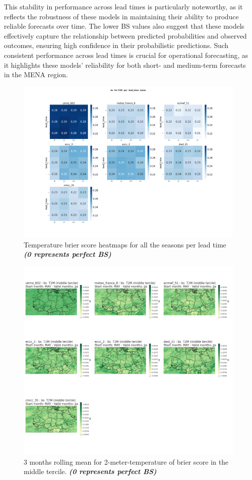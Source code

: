 This stability in performance across lead times is particularly noteworthy, as it reflects the robustness of these models in maintaining their ability to produce reliable forecasts over time. The lower BS values also suggest that these models effectively capture the relationship between predicted probabilities and observed outcomes, ensuring high confidence in their probabilistic predictions. Such consistent performance across lead times is crucial for operational forecasting, as it highlights these models' reliability for both short- and medium-term forecasts in the MENA region.

\begin{figure}[H]
    \centering
    \includegraphics[width=1\linewidth]{plots/prob/bs/bs_T2M_lead_time_mena.png}
    \caption{Temperature brier score heatmaps for all the seasons per lead time \textbf{\textit{(0 represents perfect BS)} }}
\end{figure}


\begin{figure}[H]
    \centering
    \includegraphics[width=1\linewidth]{plots/prob/bs/bs_jja_t2m_middle.png}
    \caption{3 months rolling mean for 2-meter-temperature of brier score in the middle tercile. \textbf{\textit{(0 represents perfect BS)} }}
\end{figure}

